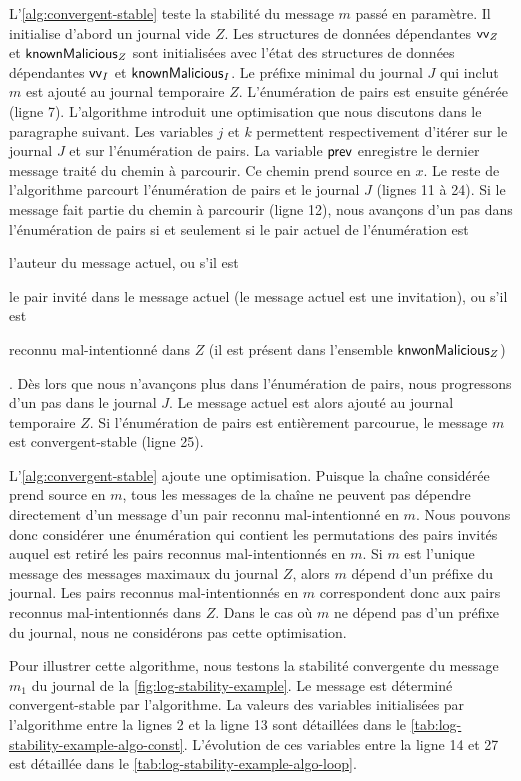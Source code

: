 L'\autoref{alg:convergent-stable} teste la stabilité du message $m$ passé en paramètre.
Il initialise d'abord un journal vide $Z$.
Les structures de données dépendantes $\operatorname{\mathsf{vv}}_Z$ et $\operatorname{\mathsf{knownMalicious}}_Z$ sont initialisées avec l'état des structures de données dépendantes $\operatorname{\mathsf{vv}}_I$ et $\operatorname{\mathsf{knownMalicious}}_I$.
Le préfixe minimal du journal $J$ qui inclut $m$ est ajouté au journal temporaire $Z$.
L'énumération de pairs est ensuite générée (ligne 7).
L'algorithme introduit une optimisation que nous discutons dans le paragraphe suivant.
Les variables $j$ et $k$ permettent respectivement d'itérer sur le journal $J$ et sur l'énumération de pairs.
La variable $\operatorname{\mathsf{prev}}$ enregistre le dernier message traité du chemin à parcourir.
Ce chemin prend source en $x$.
Le reste de l'algorithme parcourt l'énumération de pairs et le journal $J$ (lignes 11 à 24).
Si le message fait partie du chemin à parcourir (ligne 12), nous avançons d'un pas dans l'énumération de pairs si et seulement si le pair actuel de l'énumération est \begin{inlinelist}\item l'auteur du message actuel, ou s'il est \item le pair invité dans le message actuel (le message actuel est une invitation), ou s'il est \item reconnu mal-intentionné dans $Z$ (il est présent dans l'ensemble $\operatorname{\mathsf{knwonMalicious}}_Z$) \end{inlinelist}.
Dès lors que nous n'avançons plus dans l'énumération de pairs, nous progressons d'un pas dans le journal $J$.
Le message actuel est alors ajouté au journal temporaire $Z$.
Si l'énumération de pairs est entièrement parcourue, le message $m$ est convergent-stable (ligne 25).

L'\autoref{alg:convergent-stable} ajoute une optimisation.
Puisque la chaîne considérée prend source en $m$, tous les messages de la chaîne ne peuvent pas dépendre directement d'un message d'un pair reconnu mal-intentionné en $m$.
Nous pouvons donc considérer une énumération qui contient les permutations des pairs invités auquel est retiré les pairs reconnus mal-intentionnés en $m$.
Si $m$ est l'unique message des messages maximaux du journal $Z$, alors $m$ dépend d'un préfixe du journal.
Les pairs reconnus mal-intentionnés en $m$ correspondent donc aux pairs reconnus mal-intentionnés dans $Z$.
Dans le cas où $m$ ne dépend pas d'un préfixe du journal, nous ne considérons pas cette optimisation.

Pour illustrer cette algorithme, nous testons la stabilité convergente du message $m_1$ du journal de la \autoref{fig:log-stability-example}.
Le message est déterminé convergent-stable par l'algorithme.
La valeurs des variables initialisées par l'algorithme entre la lignes 2 et la ligne 13 sont détaillées dans le \autoref{tab:log-stability-example-algo-const}.
L'évolution de ces variables entre la ligne 14 et 27 est détaillée dans le \autoref{tab:log-stability-example-algo-loop}.

